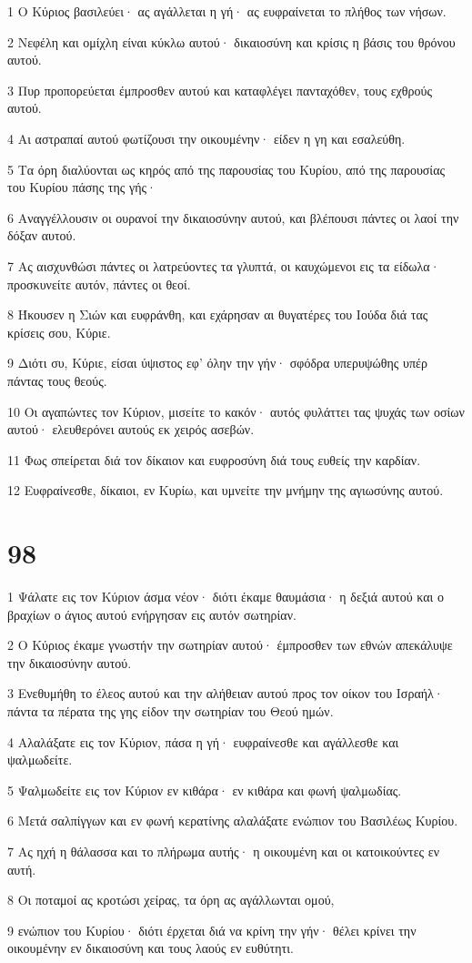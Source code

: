 \par 1 Ο Κύριος βασιλεύει· ας αγάλλεται η γή· ας ευφραίνεται το πλήθος των νήσων.
\par 2 Νεφέλη και ομίχλη είναι κύκλω αυτού· δικαιοσύνη και κρίσις η βάσις του θρόνου αυτού.
\par 3 Πυρ προπορεύεται έμπροσθεν αυτού και καταφλέγει πανταχόθεν, τους εχθρούς αυτού.
\par 4 Αι αστραπαί αυτού φωτίζουσι την οικουμένην· είδεν η γη και εσαλεύθη.
\par 5 Τα όρη διαλύονται ως κηρός από της παρουσίας του Κυρίου, από της παρουσίας του Κυρίου πάσης της γής·
\par 6 Αναγγέλλουσιν οι ουρανοί την δικαιοσύνην αυτού, και βλέπουσι πάντες οι λαοί την δόξαν αυτού.
\par 7 Ας αισχυνθώσι πάντες οι λατρεύοντες τα γλυπτά, οι καυχώμενοι εις τα είδωλα· προσκυνείτε αυτόν, πάντες οι θεοί.
\par 8 Ήκουσεν η Σιών και ευφράνθη, και εχάρησαν αι θυγατέρες του Ιούδα διά τας κρίσεις σου, Κύριε.
\par 9 Διότι συ, Κύριε, είσαι ύψιστος εφ' όλην την γήν· σφόδρα υπερυψώθης υπέρ πάντας τους θεούς.
\par 10 Οι αγαπώντες τον Κύριον, μισείτε το κακόν· αυτός φυλάττει τας ψυχάς των οσίων αυτού· ελευθερόνει αυτούς εκ χειρός ασεβών.
\par 11 Φως σπείρεται διά τον δίκαιον και ευφροσύνη διά τους ευθείς την καρδίαν.
\par 12 Ευφραίνεσθε, δίκαιοι, εν Κυρίω, και υμνείτε την μνήμην της αγιωσύνης αυτού.

\chapter{98}

\par 1 Ψάλατε εις τον Κύριον άσμα νέον· διότι έκαμε θαυμάσια· η δεξιά αυτού και ο βραχίων ο άγιος αυτού ενήργησαν εις αυτόν σωτηρίαν.
\par 2 Ο Κύριος έκαμε γνωστήν την σωτηρίαν αυτού· έμπροσθεν των εθνών απεκάλυψε την δικαιοσύνην αυτού.
\par 3 Ενεθυμήθη το έλεος αυτού και την αλήθειαν αυτού προς τον οίκον του Ισραήλ· πάντα τα πέρατα της γης είδον την σωτηρίαν του Θεού ημών.
\par 4 Αλαλάξατε εις τον Κύριον, πάσα η γή· ευφραίνεσθε και αγάλλεσθε και ψαλμωδείτε.
\par 5 Ψαλμωδείτε εις τον Κύριον εν κιθάρα· εν κιθάρα και φωνή ψαλμωδίας.
\par 6 Μετά σαλπίγγων και εν φωνή κερατίνης αλαλάξατε ενώπιον του Βασιλέως Κυρίου.
\par 7 Ας ηχή η θάλασσα και το πλήρωμα αυτής· η οικουμένη και οι κατοικούντες εν αυτή.
\par 8 Οι ποταμοί ας κροτώσι χείρας, τα όρη ας αγάλλωνται ομού,
\par 9 ενώπιον του Κυρίου· διότι έρχεται διά να κρίνη την γήν· θέλει κρίνει την οικουμένην εν δικαιοσύνη και τους λαούς εν ευθύτητι.

